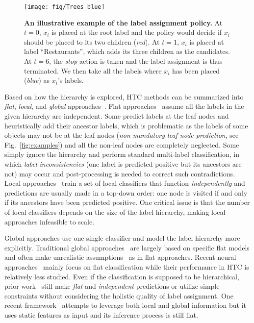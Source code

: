 \documentclass[11pt,a4paper]{article}
\begin{document}
\begin{figure*}[ht]
    \centering
    \texttt{[image: fig/Trees\_blue]}
    \vspace*{-.15cm}
     \caption{\textbf{An illustrative example of the label assignment policy.} At $t=0$, $x_i$ is placed at the root label and the policy would decide if $x_i$ should be placed to its two children (\textit{red}). At $t=1$, $x_i$ is placed at label ``Restaurants'', which adds its three children as the candidates. At $t=6$, the \textit{stop} action is taken and the label assignment is thus terminated. We then take all the labels where $x_i$ has been placed (\textit{blue}) as $x_i$'s labels.}
    \label{fig:example}
    \vspace*{-.2cm}
\end{figure*}

Based on how the hierarchy is explored, HTC methods can be summarized into \textit{flat}, \textit{local}, and \textit{global} approaches~\citep{silla2011survey}.
Flat approaches~\cite{hayete2005gotrees,johnson2014effective} assume all the labels in the given hierarchy are independent. 
Some predict labels at the leaf nodes and heuristically add their ancestor labels, which is problematic as the labels of some objects may not be at the leaf nodes (\textit{non-mandatory leaf node prediction}, see Fig.~\ref{fig:examples}) and all the non-leaf nodes are completely neglected.
Some simply ignore the hierarchy and perform standard multi-label classification, in which \textit{label inconsistencies} (one label is predicted positive but its ancestors are not) may occur and post-processing is needed to correct such contradictions. 
Local approaches~\cite{koller1997hierarchically,cesa2006hierarchical} train a set of local classifiers that function \textit{independently} and predictions are usually made in a top-down order: one node is visited if and only if its ancestors have been predicted positive.
One critical issue is that the number of local classifiers depends on the size of the label hierarchy, making local approaches infeasible to scale.

Global approaches use one single classifier and model the label hierarchy more explicitly.
Traditional global approaches~\citep{wang2001hierarchical,silla2009global} are largely based on specific flat models and often make unrealistic assumptions~\cite{cai2004hierarchical} as in flat approaches.
Recent neural approaches~\citep{kim2014convolutional,yang2016hierarchical} mainly focus on flat classification while their performance in HTC is relatively less studied.
Even if the classification is supposed to be hierarchical, prior work~\citep{gopal2013recursive,johnson2014effective,peng2018large} still make \textit{flat} and \textit{independent} predictions or utilize simple constraints without considering the holistic quality of label assignment.
One recent framework~\citep{wehrmann2018hierarchical} attempts to leverage both local and global information but it uses static features as input and its inference process is still flat.
\end{document}
